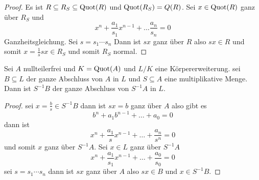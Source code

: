\begin{proof}
    Es ist $R\subseteq R_S\subseteq \operatorname{Quot}(R)$ und $\operatorname{Quot}(R_S)=Q(R)$.
    Sei $x\in \operatorname{Quot}(R)$ ganz über $R_S$ und $$x^n+\frac{a_1}{s_1}x^{n-1}+\dots \frac{a_n}{s_n}=0$$ Ganzheitsgleichung. Sei $s=s_1\cdots s_n$
    Dann ist $sx$ ganz über $R$ also $sx\in R$ und somit $x=\frac 1 s sx\in R_S$ und somit $R_S$ normal.
\end{proof}
\begin{Lemma}
    Sei $A$ nullteilerfrei und $K=\operatorname{Quot}(A)$ und $L/K$ eine Körpererweiterung. sei $B\subseteq L$ der ganze Abschluss von $A$ in $L$ und $S\subseteq A$ eine multiplikative Menge. Dann ist $S^{-1}B$ der ganze Abschluss von $S^{-1}A$ in $L$.
\end{Lemma}
\begin{proof}
    sei $x=\frac bs \in S^{-1}B$ dann ist $sx=b$ ganz über $A$ also gibt es $$b^n+a_1b^{n-1}+\dots+a_0=0$$ dann ist $$x^n+\frac{a_1}{s}x^{n-1}+\dots+\frac{a_n}{s^n}=0$$ und somit $x$ ganz über $S^{-1}A$.
    Sei $x\in L$ ganz über $S^{-1}A$
    $$x^n+\frac{a_1}{s_1}x^{n-1}+\dots+\frac{a_0}{s_0}=0$$ sei $s=s_1\cdots s_n$ dann ist $sx$ ganz über $A$ also $sx\in B$ und $x\in S^{-1}B$.
\end{proof}

